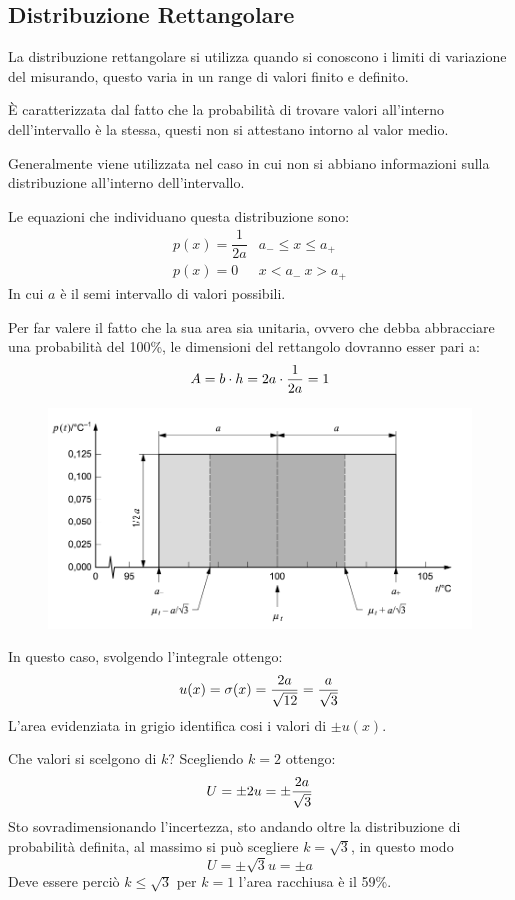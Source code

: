 \documentclass[a4paper, 15pt]{article}
\begin{document}
\subsection{Distribuzione Rettangolare}
\begin{adjustwidth}{2in}{}	
	La distribuzione rettangolare si utilizza quando si conoscono i limiti di
	variazione del misurando, questo varia in un range di valori finito e definito.
	
	È caratterizzata dal fatto che la probabilità di trovare valori all’interno dell’intervallo è la stessa, questi non si attestano intorno al valor medio. 
	
	Generalmente viene utilizzata nel caso in cui non si abbiano informazioni sulla
	distribuzione all’interno dell’intervallo.\newline
	
	Le equazioni che individuano questa distribuzione sono:
	\[\begin{matrix}		
			p(x) = \dfrac{1}{2a} & a_- \leq x \leq a_+ \\
			p(x) = 0 & x<a_- ~ x>a_+		
	\end{matrix}\]
    In cui $a$ è il semi intervallo di valori possibili.
    
    Per far valere il fatto che la sua area sia unitaria, ovvero che debba abbracciare una probabilità del 100\%, le dimensioni del rettangolo dovranno esser pari a:
    \[A = b\cdot h = 2a\cdot{1\over2a} = 1\]   
    \begin{figure}[H]
    	\centering
    	\includegraphics[width=0.7\linewidth]{fig/screenshot002}
    	\label{fig:screenshot002}
    \end{figure}  
\newpage
	In questo caso, svolgendo l'integrale ottengo:
	\[u(x) = \sigma(x) = {2a\over\sqrt{12}} = {a\over\sqrt{3}}\]
	 L'area evidenziata in grigio identifica cosi i valori di $\pm u(x)$. \newline
	 
	 Che valori si scelgono di $k$? Scegliendo $k=2$ ottengo:
	 \[ U = \pm 2u = \pm{2a\over\sqrt{3}} \] 
	 Sto sovradimensionando l'incertezza, sto andando oltre la distribuzione di probabilità definita, al massimo si può scegliere $k = \sqrt{3}$, in questo modo 
	  \[ U = \pm \sqrt{3}u = \pm a  \]
	  Deve essere perciò $k\leq\sqrt{3}$ per $k=1$ l'area racchiusa è il 59\%. \newline
	  

\end{adjustwidth}
\end{document}
